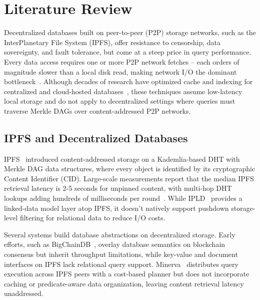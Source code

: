 
\section{Literature Review}
\label{sec:litreview}

Decentralized databases built on peer-to-peer (P2P) storage networks, such as the InterPlanetary File System (IPFS), offer resistance to censorship, data sovereignty, and fault tolerance, but come at a steep price in query performance. Every data access requires one or more P2P network fetches -- each orders of magnitude slower than a local disk read, making network I/O the dominant bottleneck~\cite{trautwein2022design, henningsen2020mapping, daniel2022ipfs}. Although decades of research have optimized cache and indexing for centralized and cloud-hosted databases~\cite{graefe2011modern, armbrust2021lakehouse}, these techniques assume low-latency local storage and do not apply to decentralized settings where queries must traverse Merkle DAGs over content-addressed P2P networks. 


\subsection{IPFS and Decentralized Databases}
\label{sec:ipfs}

IPFS~\cite{benet2014ipfs} introduced content-addressed storage on a Kademlia-based DHT with Merkle DAG data structures, where every object is identified by its cryptographic Content Identifier (CID). Large-scale measurements report that the median IPFS retrieval latency is 2-5 seconds for unpinned content, with multi-hop DHT lookups adding hundreds of milliseconds per round~\cite{trautwein2022design, henningsen2020mapping, daniel2022ipfs}. While IPLD~\cite{ipld2023spec} provides a linked-data model layer atop IPFS, it doesn't natively support pushdown storage-level filtering for relational data to reduce I/O costs.

Several systems build database abstractions on decentralized storage. Early efforts, such as BigChainDB~\cite{mcconaghy2016bigchaindb}, overlay database semantics on blockchain consensus but inherit throughput limitations, while key-value and document interfaces on IPFS lack relational query support. Minerva~\cite{yao2024minerva} distributes query execution across IPFS peers with a cost-based planner but does not incorporate caching or predicate-aware data organization, leaving content retrieval latency unaddressed.

